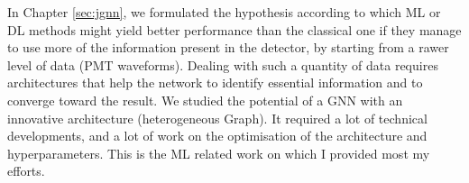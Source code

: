 \documentclass[../main.tex]{subfiles}
\begin{document}
%
%
%
%
%

In Chapter \ref{sec:jgnn}, we formulated the hypothesis according to which ML or DL methods might yield better performance than the classical one if they manage to use more of the information present in the detector, by starting from a rawer level of data (PMT waveforms). Dealing with such a quantity of data requires architectures that help the network to identify essential information and to converge toward the result. We studied the potential of a GNN with an innovative architecture (heterogeneous Graph). It required a lot of technical developments, and a lot of work on the optimisation of the architecture and hyperparameters. This is the ML related work on which I provided most my efforts.
\end{document}
